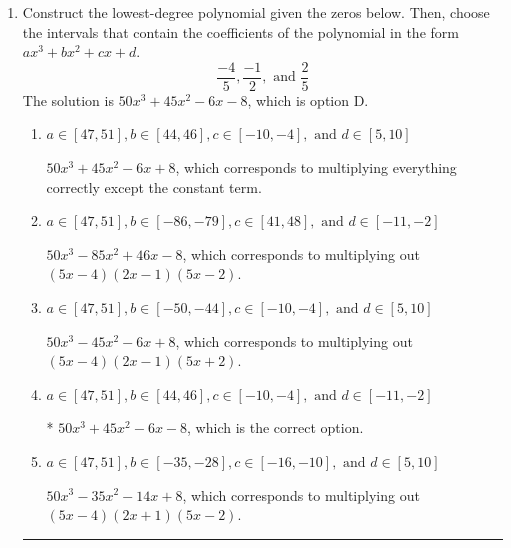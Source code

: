 \documentclass{extbook}[14pt]
\newcommand{\litem}[1]{\item #1

\rule{\textwidth}{0.4pt}}
\begin{document}
\begin{enumerate}\litem{
Construct the lowest-degree polynomial given the zeros below. Then, choose the intervals that contain the coefficients of the polynomial in the form $ax^3+bx^2+cx+d$.
\[ \frac{-4}{5}, \frac{-1}{2}, \text{ and } \frac{2}{5} \]The solution is \( 50x^{3} +45 x^{2} -6 x -8 \), which is option D.\begin{enumerate}[label=\Alph*.]
\item \( a \in [47, 51], b \in [44, 46], c \in [-10, -4], \text{ and } d \in [5, 10] \)

$50x^{3} +45 x^{2} -6 x + 8$, which corresponds to multiplying everything correctly except the constant term.
\item \( a \in [47, 51], b \in [-86, -79], c \in [41, 48], \text{ and } d \in [-11, -2] \)

$50x^{3} -85 x^{2} +46 x -8$, which corresponds to multiplying out $(5x -4)(2x -1)(5x -2)$.
\item \( a \in [47, 51], b \in [-50, -44], c \in [-10, -4], \text{ and } d \in [5, 10] \)

$50x^{3} -45 x^{2} -6 x + 8$, which corresponds to multiplying out $(5x -4)(2x -1)(5x + 2)$.
\item \( a \in [47, 51], b \in [44, 46], c \in [-10, -4], \text{ and } d \in [-11, -2] \)

* $50x^{3} +45 x^{2} -6 x -8$, which is the correct option.
\item \( a \in [47, 51], b \in [-35, -28], c \in [-16, -10], \text{ and } d \in [5, 10] \)

$50x^{3} -35 x^{2} -14 x + 8$, which corresponds to multiplying out $(5x -4)(2x + 1)(5x -2)$.
\end{enumerate}

}
\end{enumerate}
\end{document}
